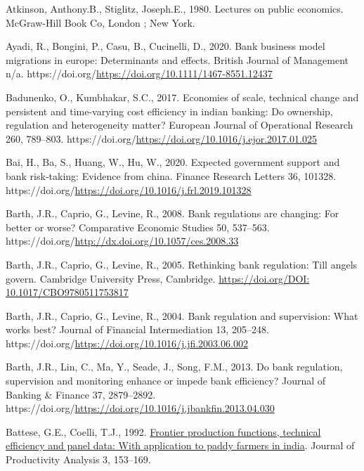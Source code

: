\documentclass[
  letterpaper,
  DIV=11,
  numbers=noendperiod]{scrreprt}
\newlength{\cslhangindent}
\newenvironment{CSLReferences}[2] %
 {\begin{list}{}{%
  \setlength{\itemindent}{0pt}
  \setlength{\leftmargin}{0pt}
  \setlength{\parsep}{0pt}
  \ifodd #1
   \setlength{\leftmargin}{\cslhangindent}
   \setlength{\itemindent}{-1\cslhangindent}
  \fi
  \setlength{\itemsep}{#2\baselineskip}}}
 {\end{list}}
\begin{document}
\begin{CSLReferences}{1}{0}
Atkinson, Anthony.B., Stiglitz, Joseph.E., 1980. Lectures on public
economics. McGraw-Hill Book Co, London ; New York.

Ayadi, R., Bongini, P., Casu, B., Cucinelli, D., 2020. Bank business
model migrations in europe: Determinants and effects. British Journal of
Management n/a.
https://doi.org/\url{https://doi.org/10.1111/1467-8551.12437}

Badunenko, O., Kumbhakar, S.C., 2017. Economies of scale, technical
change and persistent and time-varying cost efficiency in indian
banking: Do ownership, regulation and heterogeneity matter? European
Journal of Operational Research 260, 789--803.
https://doi.org/\url{https://doi.org/10.1016/j.ejor.2017.01.025}

Bai, H., Ba, S., Huang, W., Hu, W., 2020. Expected government support
and bank risk-taking: Evidence from china. Finance Research Letters 36,
101328. https://doi.org/\url{https://doi.org/10.1016/j.frl.2019.101328}

Barth, J.R., Caprio, G., Levine, R., 2008. Bank regulations are
changing: For better or worse? Comparative Economic Studies 50,
537--563. https://doi.org/\url{http://dx.doi.org/10.1057/ces.2008.33}

Barth, J.R., Caprio, G., Levine, R., 2005. Rethinking bank regulation:
Till angels govern. Cambridge University Press, Cambridge.
\href{https://doi.org/DOI:\%2010.1017/CBO9780511753817}{https://doi.org/DOI:
10.1017/CBO9780511753817}

Barth, J.R., Caprio, G., Levine, R., 2004. Bank regulation and
supervision: What works best? Journal of Financial Intermediation 13,
205--248.
https://doi.org/\url{https://doi.org/10.1016/j.jfi.2003.06.002}

Barth, J.R., Lin, C., Ma, Y., Seade, J., Song, F.M., 2013. Do bank
regulation, supervision and monitoring enhance or impede bank
efficiency? Journal of Banking \& Finance 37, 2879--2892.
https://doi.org/\url{https://doi.org/10.1016/j.jbankfin.2013.04.030}

Battese, G.E., Coelli, T.J., 1992.
\href{http://www.jstor.org/stable/41770578}{Frontier production
functions, technical efficiency and panel data: With application to
paddy farmers in india}. Journal of Productivity Analysis 3, 153--169.


\end{CSLReferences}
\end{document}
